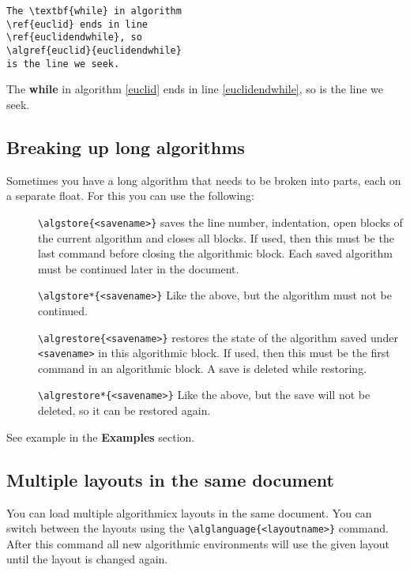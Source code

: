 \documentclass{article}
\begin{document}
\noindent\begin{minipage}[t]{0.5\linewidth}
\begin{verbatim}
The \textbf{while} in algorithm
\ref{euclid} ends in line
\ref{euclidendwhile}, so
\algref{euclid}{euclidendwhile}
is the line we seek.
\end{verbatim}
\end{minipage}\begin{minipage}[t]{0.5\linewidth}
The \textbf{while} in algorithm \ref{euclid} ends in line \ref{euclidendwhile},
so  is the line we seek.
\end{minipage}

\subsection{Breaking up long algorithms}

Sometimes you have a long algorithm that needs to be broken into parts, each on a
separate float. For this you can use the following:

\begin{description}
\item[]\verb:\algstore{<savename>}: saves the line number, indentation, open blocks of
the current algorithm and closes all blocks. If used, then this must be the last command
before closing the algorithmic block. Each saved algorithm must be continued later in the
document.
\item[]\verb:\algstore*{<savename>}: Like the above, but the algorithm must not be continued.
\item[]\verb:\algrestore{<savename>}: restores the state of the algorithm saved under
\verb:<savename>: in this algorithmic block. If used, then this must be the first command
in an algorithmic block. A save is deleted while restoring.
\item[]\verb:\algrestore*{<savename>}: Like the above, but the save will not be deleted, so it
can be restored again.
\end{description}

See example in the \textbf{Examples} section.

\subsection{Multiple layouts in the same document}

You can load multiple algorithmicx layouts in the same document. You can switch between the layouts
using the \verb:\alglanguage{<layoutname>}: command. After this command all new algorithmic
environments will use the given layout until the layout is changed again.
\end{document}
